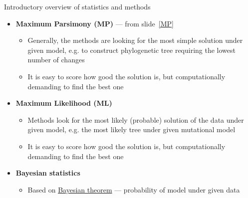\documentclass[compress, ucs, xelatex, 11pt, xcolor=svgnames,
  hyperref={
    bookmarks=true,
    unicode=true,
    colorlinks=true,
    pdftitle={Molecular data in R},
    plainpages=false,
    pdfauthor={Vojtech Zeisek},
    pdfsubject={Course about phylogeny and evolution in R},
    pdfcreator={XeLaTeX},
    pdfkeywords={R, evolution, phylogeny, molecular data},
    linkcolor=Tomato,
    anchorcolor=SaddleBrown,
    citecolor=Goldenrod,
    filecolor=DarkMagenta,
    menucolor=Sienna,
    urlcolor=DarkTurquoise,
    pdftex},
  url={hyphens, lowtilde} %
  ]{beamer}
\begin{document}
\begin{frame}[allowframebreaks]{Introductory overview of statistics and methods}
\begin{itemize}
\begin{itemize}
      \item In molecular data, each locus is more or less independent variable --- 1000~bp alignment has 1000 variables: How to display plot with 1000 axes to be able to really see something?
      \item Methods like Principal Component Analysis (\textbf{PCA}), Non-Metric Multidimensional Scaling (\textbf{NMDS}) or \textbf{PCoA} look for correlations between pairs of variables to reduce them into new variables --- after many steps new uncorrelated variables retaining maximum of original variability are constructed
      \item New variables are sorted according amount of variability they show (the decrease is very steep --- first 1--4~axes are usually enough) --- it is possible to display xy-scatter plot showing most of variability of the data
      \item Good for data display and creation of hypotheses --- not to verify them (there is no statistical test)
      \item Data are commonly scaled --- all variables are in same scale
    \end{itemize}
    \item \textbf{Maximum Parsimony (MP)} --- from slide~\ref{MP}
    \begin{itemize}
      \item Generally, the methods are looking for the most simple solution under given model, e.g. to construct phylogenetic tree requiring the lowest number of changes
      \item It is easy to score how good the solution is, but computationally demanding to find the best one
    \end{itemize}
    \item \textbf{Maximum Likelihood (ML)}
    \begin{itemize}
      \item Methods look for the most likely (probable) solution of the data under given model, e.g. the most likely tree under given mutational model
      \item It is easy to score how good the solution is, but computationally demanding to find the best one
    \end{itemize}
    \item \textbf{Bayesian statistics}
    \begin{itemize}
      \item Based on \href{https://en.wikipedia.org/wiki/Bayes_theorem}{Bayesian theorem} --- probability of model under given data

\end{itemize}
\end{itemize}
\end{frame}
\end{document}
